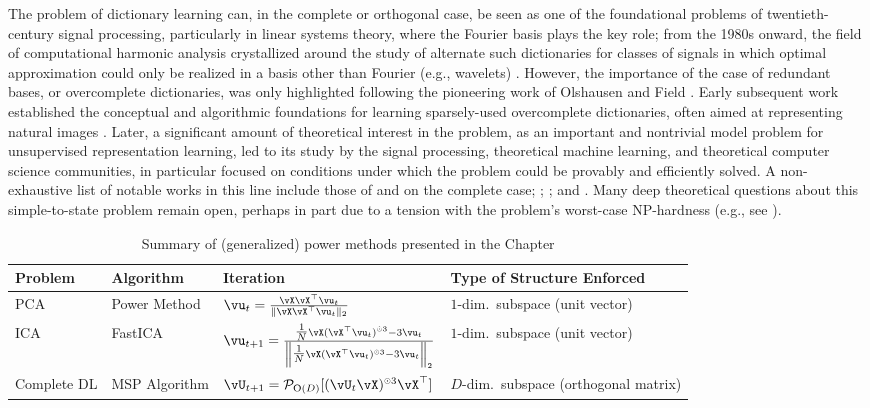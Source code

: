 \documentclass[../../book-main.tex]{subfiles}
\begin{document}
The problem of
dictionary learning can, in the complete or orthogonal case, be seen as one of
the foundational problems of twentieth-century signal processing, particularly
in linear systems theory, where the Fourier basis plays the key role; from the
1980s onward, the field of computational harmonic analysis crystallized around
the study of alternate such dictionaries for classes of signals in which optimal
approximation could only be realized in a basis other than Fourier (e.g., wavelets)
\cite{Donoho1998-zf}. However, the importance of the case of redundant bases, or
overcomplete dictionaries, was only highlighted following the pioneering work of
Olshausen and Field \cite{Olshausen1996-ap,Olshausen1997-yv}. Early subsequent work
established the conceptual and algorithmic foundations for learning
sparsely-used overcomplete dictionaries, often aimed at representing natural
images
\cite{Donoho2001-tl,DonohoD2003-PNAS,Elad2006-yi,Murray2007-cw,aharon2006k,Mairal2014-nq,Gribonval2015-fy}.
Later, a significant amount of theoretical interest in the problem, as an
important and nontrivial model problem for unsupervised representation learning,
led to its study by the signal processing, theoretical machine learning, and
theoretical computer science communities, in particular focused on conditions
under which the problem could be provably and efficiently solved.
A non-exhaustive list of notable works in this line include those of
\textcite{Spielman2012-tl} and \textcite{sun2017complete_a} on the complete
case; \textcite{pmlr-v40-Arora15}; \textcite{Barak2015-uu}; and
\textcite{Qu2020Geometric}. Many deep theoretical questions about this
simple-to-state problem remain open, perhaps in part due to a tension with the
problem's worst-case NP-hardness (e.g., see \textcite{Tillmann2015-up}).

\begin{table}[tb]
\centering
    \caption{Summary of (generalized) power methods presented in the Chapter }
    \label{tab:power-method-summary}
\begin{tabular}{llll}
\toprule
Problem & Algorithm & Iteration & Type of Structure Enforced \\
\midrule
PCA & Power Method & $\vu_{t} = \frac{\vX\vX^\top
    \vu_{t}}{\norm{\vX\vX^\top \vu_{t}}_2}$ & $1$-dim.\ subspace (unit vector) \\
    \addlinespace
    ICA & FastICA &
    $\vu_{t+1} = \frac{\tfrac{1}{N}\vX (\vX^\top \vu_{t})^{\hada 3}-
    3 \vu_{t}}{\norm*{\tfrac{1}{N}\vX (\vX^\top \vu_{t})^{\hada 3}-
    3 \vu_{t}}_2}$
    & $1$-dim.\ subspace (unit vector) \\
    \addlinespace
    Complete DL & MSP Algorithm &
    $\vU_{t+1} = \mathcal{P}_{\mathrm O(D)}[( {\vU_t \vX})^{\hada 3}\vX^\top]$
    & $D$-dim.\ subspace (orthogonal matrix) \\
\bottomrule
\end{tabular}
\end{table}
\end{document}
